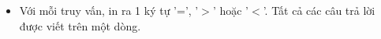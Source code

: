 \begin{itemize}
	\item     Với mỗi truy vấn, in ra 1 ký tự '=', '$>$' hoặc '$<$'. Tất cả các câu trả lời được viết trên một dòng.   
\end{itemize}